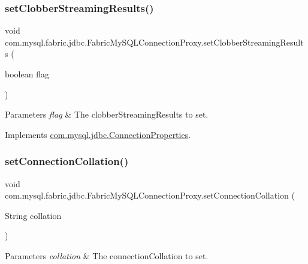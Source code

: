 \subsubsection{\texorpdfstring{set\+Clobber\+Streaming\+Results()}{setClobberStreamingResults()}}
{\footnotesize\ttfamily void com.\+mysql.\+fabric.\+jdbc.\+Fabric\+My\+S\+Q\+L\+Connection\+Proxy.\+set\+Clobber\+Streaming\+Results (\begin{DoxyParamCaption}\item[{boolean}]{flag }\end{DoxyParamCaption})}


\begin{DoxyParams}{Parameters}
{\em flag} & The clobber\+Streaming\+Results to set. \\
\hline
\end{DoxyParams}


Implements \mbox{\hyperlink{interfacecom_1_1mysql_1_1jdbc_1_1_connection_properties_a3bb976fbcde1b60e4dae84b49320de5f}{com.\+mysql.\+jdbc.\+Connection\+Properties}}.

\mbox{\label{classcom_1_1mysql_1_1fabric_1_1jdbc_1_1_fabric_my_s_q_l_connection_proxy_af37eea6c8c5829fa8ef85ca03b1c5940}} 
\subsubsection{\texorpdfstring{set\+Connection\+Collation()}{setConnectionCollation()}}
{\footnotesize\ttfamily void com.\+mysql.\+fabric.\+jdbc.\+Fabric\+My\+S\+Q\+L\+Connection\+Proxy.\+set\+Connection\+Collation (\begin{DoxyParamCaption}\item[{String}]{collation }\end{DoxyParamCaption})}


\begin{DoxyParams}{Parameters}
{\em collation} & The connection\+Collation to set. \\
\hline
\end{DoxyParams}


